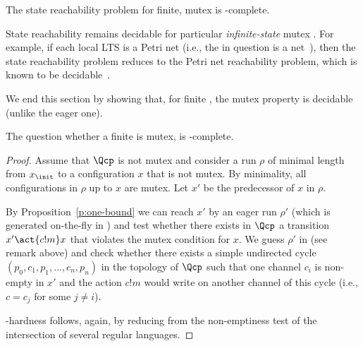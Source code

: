 \documentclass{LMCS}
\newenvironment{proposition}{\begin{prop}}{\end{prop}}
\newenvironment{remark}{\begin{rem}}{\end{rem}}
\begin{document}
\begin{proposition} \label{thm:mutextoeager}
  The state reachability problem for finite, mutex \qcp
  is \pspace-complete.
\end{proposition}

\begin{remark}
  State reachability remains decidable for particular
  \emph{infinite-state} mutex \qcp. For example, if each local
  LTS  is a Petri net (i.e., the \qcp in question
  is a \fifo net~\cite{finkel-a-1987-106-a}), then the state
  reachability problem reduces to the Petri net reachability
  problem, which is known to be
  decidable~\cite{mayr-e-1984-441-a,kosaraju-s-1982-267-a}.
  \label{rem:qcp_local_dec}
\end{remark}

We end this section by showing that, for finite \qcp, the mutex
property is decidable (unlike the eager one).

\begin{proposition} \label{thm:testmutex}
  The question whether a finite \qcp is mutex, is \pspace-complete.
\end{proposition}
\begin{proof}
  Assume that $\Qcp$ is not mutex and consider a run $\rho$
  of minimal length from $x_\init$ to a configuration
  $x$ that is not mutex.
  By minimality, all configurations in $\rho$ up to $x$
  are mutex.
  Let $x'$ be the predecessor of $x$ in $\rho$.

  By Proposition~\ref{p:one-bound} we can reach $x'$ by an eager
  run $\rho'$ (which is generated on-the-fly in \pspace) and test whether
  there exists in $\Qcp$ a transition $x' \act{c!m} x$ that
  violates the mutex condition for $x$.  We guess $\rho'$ in \pspace
  (see remark above) and check
  whether there exists a simple undirected cycle $(p_0,c_1,p_1,\ldots,c_n,p_n)$
  in the topology of $\Qcp$ such that one channel $c_i$ is non-empty in $x'$
  and the action $c!m$ would write on another channel of this cycle
  (i.e., $c = c_j$ for some $j \neq i$).


  \pspace-hardness follows, again, by reducing from the non-emptiness
  test of the intersection of several regular languages.
\end{proof}
\end{document}
